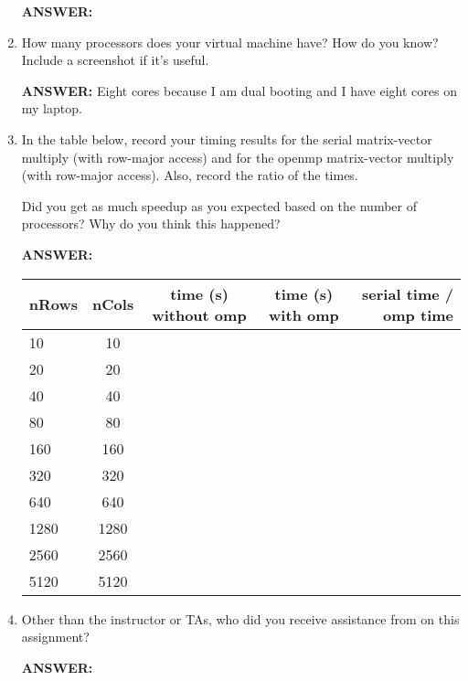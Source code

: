 \documentclass[letter]{article}
\begin{document}
\begin{enumerate}
        \textbf{ANSWER:} %
        
        \item How many processors does your virtual machine have? How do you know? Include a screenshot if it's useful. 
        
        \textbf{ANSWER:} Eight cores because I am dual booting and I have eight cores on my laptop.
       
        \item In the table below, record your timing results for the serial matrix-vector multiply (with row-major access) and for the openmp matrix-vector multiply (with row-major access).   Also, record the ratio of the times.

        Did you get as much speedup as you expected based on the number of processors? Why do you think this happened?
        
        \textbf{ANSWER:} %

         \begin{center}
        \begin{tabular}{|l | c | c | c |r |} 
        \hline
        \textbf{nRows} & \textbf{nCols} & \textbf{time (s) without omp} & \textbf{time (s) with omp} & \textbf{serial time / omp time} \\ \hline
        10 & 10 & & &   \\
        20 & 20 & & &   \\
        40 & 40 & & &  \\
        80 & 80 & & &  \\
        160 & 160 & &  &  \\
        320 & 320 & & &  \\
        640 & 640 & & &  \\
        1280 & 1280 & & & \\ 
        2560 & 2560 & & &  \\
        5120 & 5120 & & &  \\\hline
        \end{tabular}
        \end{center}

        \item Other than the instructor or TAs, who did you receive assistance from on this assignment?
        
        \textbf{ANSWER:} %
        
    \end{enumerate}
\end{document}
